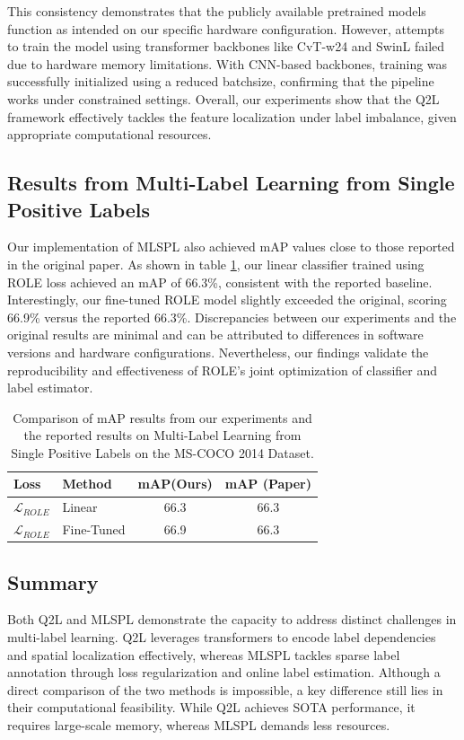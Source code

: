 \documentclass[lettersize,journal]{IEEEtran}
\begin{document}
This consistency demonstrates that the publicly available pretrained models function as intended on our specific hardware configuration. However, attempts to train the model using transformer backbones like CvT-w24 and SwinL failed due to hardware memory limitations. With CNN-based backbones, training was successfully initialized using a reduced batchsize, confirming that the pipeline works under constrained settings. Overall, our experiments show that the Q2L framework effectively tackles the feature localization under label imbalance, given appropriate computational resources.



\subsection{Results from Multi-Label Learning from Single Positive Labels}
Our implementation of MLSPL also achieved mAP values close to those reported in the original paper. As shown in table \ref{tab:MLSPL_map_comparison}, our linear classifier trained using ROLE loss achieved an mAP of 66.3\%, consistent with the reported baseline. Interestingly, our fine-tuned ROLE model slightly exceeded the original, scoring 66.9\% versus the reported 66.3\%. Discrepancies between our experiments and the original results are minimal and can be attributed to differences in software versions and hardware configurations. Nevertheless, our findings validate the reproducibility and effectiveness of ROLE's joint optimization of classifier and label estimator.

\begin{table}[H]
    \small
    \caption{Comparison of mAP results from our experiments and the reported results on Multi-Label Learning from Single Positive Labels on the MS-COCO 2014 Dataset.}
    \label{tab:MLSPL_map_comparison}
    \centering
    \begin{tabular}{l l c c}
    \toprule
    \textbf{Loss} & \textbf{Method} & \textbf{mAP(Ours)} & \textbf{mAP (Paper)} \\
    \midrule
    $\mathcal{L}_{ROLE}$ & Linear & 66.3 & 66.3 \\
    $\mathcal{L}_{ROLE}$ & Fine-Tuned & 66.9 & 66.3 \\
    \bottomrule
    \end{tabular}
\end{table}

\subsection{Summary}
Both Q2L and MLSPL demonstrate the capacity to address distinct challenges in multi-label learning. Q2L leverages transformers to encode label dependencies and spatial localization effectively, whereas MLSPL tackles sparse label annotation through loss regularization and online label estimation. Although a direct comparison of the two methods is impossible, a key difference still lies in their computational feasibility. While Q2L achieves SOTA performance, it requires large-scale memory, whereas MLSPL demands less resources.
\end{document}
